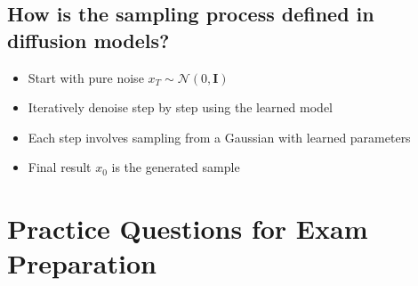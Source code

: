 \subsection*{How is the sampling process defined in diffusion models?}
\begin{itemize}
    \item Start with pure noise $x_T \sim \mathcal{N}(0, \mathbf{I})$
    \item Iteratively denoise step by step using the learned model
    \item Each step involves sampling from a Gaussian with learned parameters
    \item Final result $x_0$ is the generated sample
\end{itemize}


\section{Practice Questions for Exam Preparation}

